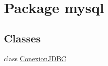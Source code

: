\hypertarget{namespacemysql}{}\section{Package mysql}
\label{namespacemysql}
\subsection*{Classes}
\begin{DoxyCompactItemize}
\item 
class \mbox{\hyperlink{classmysql_1_1_conexion_j_d_b_c}{Conexion\+J\+D\+BC}}
\end{DoxyCompactItemize}
